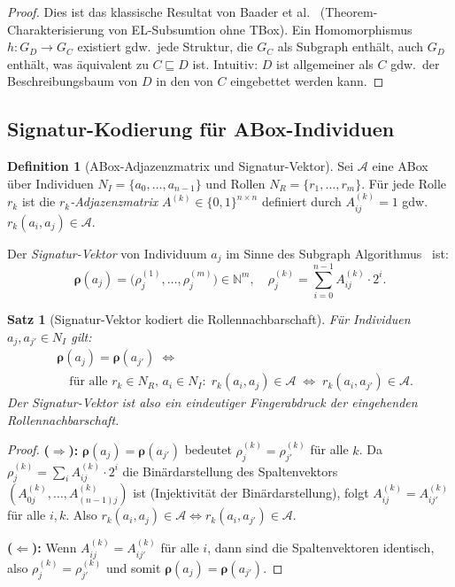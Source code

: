 ﻿\documentclass[a4paper,12pt]{article}
\theoremstyle{definition}
\newtheorem{definition}{Definition}[section]
\theoremstyle{plain}
\newtheorem{satz}{Satz}[section]
\theoremstyle{remark}
\newcommand{\Abox}{\ensuremath{\mathcal{A}}}
\begin{document}
\begin{proof}
Dies ist das klassische Resultat von Baader et al.~\cite{Baader2007}
(Theorem-Charakterisierung von \textsf{EL}-Subsumtion ohne TBox).
Ein Homomorphismus $h: G_D \to G_C$ existiert gdw.\ jede
Struktur, die $G_C$ als Subgraph enth{\"a}lt, auch $G_D$ enth{\"a}lt,
was {\"a}quivalent zu $C \sqsubseteq D$ ist.
Intuitiv: $D$ ist allgemeiner als $C$ gdw.\ der Beschreibungsbaum
von $D$ in den von $C$ eingebettet werden kann.
\end{proof}

\subsection{Signatur-Kodierung f{\"u}r ABox-Individuen}
\label{sec:signatur-abox}

\begin{definition}[ABox-Adjazenzmatrix und Signatur-Vektor]
\label{def:abox-sig}
Sei $\Abox$ eine ABox {\"u}ber Individuen $N_I = \{a_0, \ldots, a_{n-1}\}$
und Rollen $N_R = \{r_1, \ldots, r_m\}$.
F{\"u}r jede Rolle $r_k$ ist die \emph{$r_k$-Adjazenzmatrix}
$A^{(k)} \in \{0,1\}^{n \times n}$ definiert durch
$A^{(k)}_{ij} = 1$ gdw.\ $r_k(a_i, a_j) \in \Abox$.

Der \emph{Signatur-Vektor} von Individuum $a_j$
im Sinne des Subgraph Algorithmus~\cite{Epp2026} ist:
\[
  \boldsymbol{\rho}(a_j) = \bigl(\rho_j^{(1)}, \ldots, \rho_j^{(m)}\bigr)
  \in \mathbb{N}^m,
  \quad
  \rho_j^{(k)} = \sum_{i=0}^{n-1} A^{(k)}_{ij} \cdot 2^i.
\]
\end{definition}

\begin{satz}[Signatur-Vektor kodiert die Rollennachbarschaft]
\label{satz:sig-nachbarschaft}
F{\"u}r Individuen $a_j, a_{j'} \in N_I$ gilt:
\begin{align*}
  &\boldsymbol{\rho}(a_j) = \boldsymbol{\rho}(a_{j'}) \;\iff \\
  &\quad\text{f{\"u}r alle } r_k \in N_R,\, a_i \in N_I:\;
   r_k(a_i, a_j) \in \Abox \;\Leftrightarrow\; r_k(a_i, a_{j'}) \in \Abox.
\end{align*}
Der Signatur-Vektor ist also ein eindeutiger Fingerabdruck der
eingehenden Rollennachbarschaft.
\end{satz}

\begin{proof}
\textbf{($\Rightarrow$):}
$\boldsymbol{\rho}(a_j) = \boldsymbol{\rho}(a_{j'})$ bedeutet
$\rho_j^{(k)} = \rho_{j'}^{(k)}$ f{\"u}r alle $k$.
Da $\rho_j^{(k)} = \sum_i A^{(k)}_{ij} \cdot 2^i$ die
Bin{\"a}rdarstellung des Spaltenvektors $(A^{(k)}_{0j}, \ldots, A^{(k)}_{(n-1)j})$
ist (Injektivit{\"a}t der Bin{\"a}rdarstellung), folgt
$A^{(k)}_{ij} = A^{(k)}_{ij'}$ f{\"u}r alle $i, k$.
Also $r_k(a_i, a_j) \in \Abox \Leftrightarrow r_k(a_i, a_{j'}) \in \Abox$.

\textbf{($\Leftarrow$):}
Wenn $A^{(k)}_{ij} = A^{(k)}_{ij'}$ f{\"u}r alle $i$,
dann sind die Spaltenvektoren identisch,
also $\rho_j^{(k)} = \rho_{j'}^{(k)}$ und somit
$\boldsymbol{\rho}(a_j) = \boldsymbol{\rho}(a_{j'})$.
\qedhere
\end{proof}
\end{document}
